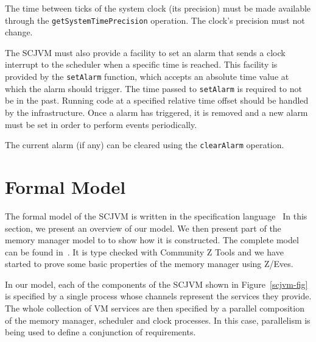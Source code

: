 \documentclass[a4paper,10pt]{report}
\begin{document}
The time between ticks of the system clock (its precision) must be
made available through the \texttt{get\-System\-Time\-Precision}
operation.
The clock's precision must not change.

The SCJVM must also provide a facility to set an alarm that sends a
clock interrupt to the scheduler when a specific time is reached.
This facility is provided by the \texttt{set\-Alarm} function, which
accepts an absolute time value at which the alarm should trigger.
The time passed to \texttt{set\-Alarm} is required to not be in the
past.
Running code at a specified relative time offset should be handled by
the infrastructure.
Once a alarm has triggered, it is removed and a new alarm must be set
in order to perform events periodically.

The current alarm (if any) can be cleared using the
\texttt{clear\-Alarm} operation.

\section{Formal Model}
\label{formal-model-section}

The formal model of the SCJVM is written in the \Circus{}
specification language~\cite{oliveira2009} In this section, we present
an overview of our model.
We then present part of the memory manager model to to show how it is
constructed.
The complete model can be found in~\cite{baxter2015}.
It is type checked with Community Z Tools and we have started to prove
some basic properties of the memory manager using Z/Eves.

In our model, each of the components of the SCJVM shown in
Figure~\ref{scjvm-fig} is specified by a single process whose channels
represent the services they provide.
The whole collection of VM services are then specified by a parallel
composition of the memory manager, scheduler and clock processes.
In this case, parallelism is being used to define a conjunction of
requirements. 
\end{document}

